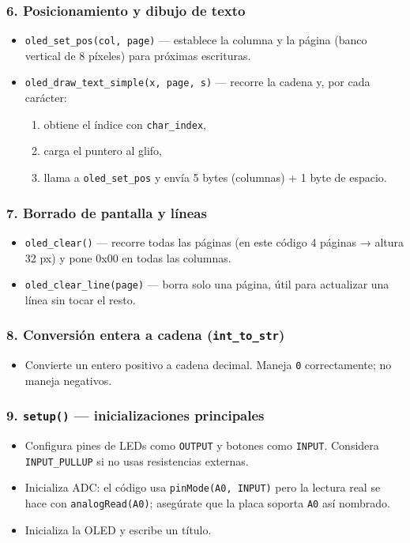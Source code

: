 \documentclass[a4paper,12pt]{article}
\begin{document}
\subsubsection*{6. Posicionamiento y dibujo de texto}
\begin{itemize}
  \item \texttt{oled\_set\_pos(col, page)} — establece la columna y la página (banco vertical de 8 píxeles) para próximas escrituras.
  \item \texttt{oled\_draw\_text\_simple(x, page, s)} — recorre la cadena y, por cada carácter:
    \begin{enumerate}
      \item obtiene el índice con \texttt{char\_index},
      \item carga el puntero al glifo,
      \item llama a \texttt{oled\_set\_pos} y envía 5 bytes (columnas) + 1 byte de espacio.
    \end{enumerate}
  
\end{itemize}

\subsubsection*{7. Borrado de pantalla y líneas}
\begin{itemize}
  \item \texttt{oled\_clear()} — recorre todas las páginas (en este código 4 páginas → altura 32 px) y pone 0x00 en todas las columnas.
  \item \texttt{oled\_clear\_line(page)} — borra solo una página, útil para actualizar una línea sin tocar el resto.
  
\end{itemize}

\subsubsection*{8. Conversión entera a cadena (\texttt{int\_to\_str})}
\begin{itemize}
  \item Convierte un entero positivo a cadena decimal. Maneja \texttt{0} correctamente; no maneja negativos.
  
\end{itemize}

\subsubsection*{9. \texttt{setup()} — inicializaciones principales}
\begin{itemize}
  \item Configura pines de LEDs como \texttt{OUTPUT} y botones como \texttt{INPUT}. Considera \texttt{INPUT\_PULLUP} si no usas resistencias externas.
  \item Inicializa ADC: el código usa \texttt{pinMode(A0, INPUT)} pero la lectura real se hace con \texttt{analogRead(A0)}; asegúrate que la placa soporta \texttt{A0} así nombrado.
  \item Inicializa la OLED y escribe un título.
\end{itemize}
\end{document}
